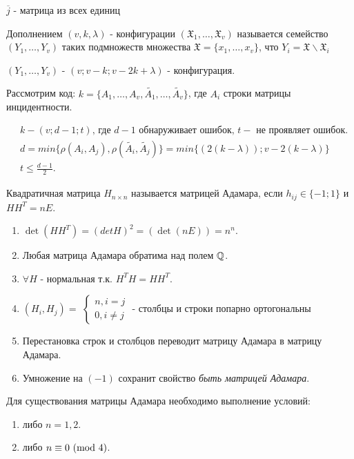 \prim $\overline{j}$ - матрица из всех единиц

\opr Дополнением $(v, k, \lambda)$ - конфигурации $( \mathfrak{X}_1, \dots, \mathfrak{X}_v)$
называется семейство $(Y_1, \dots, Y_v)$ таких подмножеств множества $\mathfrak{X} = \lbrace x_1, \dots, x_v\rbrace$,
что $Y_i = \mathfrak{X}\backslash\mathfrak{X}_i$

\utv
$(Y_1, \dots, Y_v)$ - $(v; v - k; v - 2k + \lambda)$ - конфигурация.

Рассмотрим код:
$k = \lbrace A_1, \dots, A_v,\tilde{A_1}, \dots, \tilde{A_v} \rbrace$, где $A_i$ строки матрицы инцидентности.

\utv
\begin{align*}
	& k - (v; d - 1; t) \text{, где } d - 1 \text{ обнаруживает ошибок, } t - \text{ не проявляет ошибок.}\\
	& d = min\lbrace \rho(A_i, A_j), \rho(\tilde{A_i}, \tilde{A_j})\rbrace = min\lbrace (2(k - \lambda));v - 2(k - \lambda) \rbrace\\
	& t \leq \frac{d - 1}{2}.
\end{align*}

\opr
Квадратичная матрица $H_{n\times n}$ называется матрицей Адамара, если $h_{ij} \in \lbrace -1; 1 \rbrace$
и $HH^T = nE$.

\prop
\begin{enumerate}
	\item $\det(HH^T) = (detH)^2 = (\det(nE)) = n^n$.
	\item Любая матрица Адамара обратима над полем $\mathbb{Q}$.
	\item $\forall H$ - нормальная т.к. $H^TH = HH^T$.
	\item $(H_i, H_j) = $
	$\begin{cases}
		n, i = j \\
		0, i \neq j
	\end{cases}$
	- столбцы и строки попарно ортогональны
	\item Перестановка строк и столбцов переводит матрицу Адамара в матрицу Адамара.
	\item Умножение на $(-1)$ сохранит свойство \emph{быть матрицей Адамара}.
\end{enumerate}

\thr
Для существования матрицы Адамара необходимо выполнение условий:
\begin{enumerate}
	\item либо $n = 1,2$.
	\item либо $n \equiv 0\ (\mathrm{mod}\ 4)$.
\end{enumerate}

